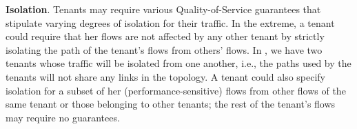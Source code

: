 \begin{compactitemize}
\item \textbf{Isolation}. Tenants may require various Quality-of-Service guarantees
  that stipulate varying degrees of isolation for their traffic. In the
  extreme, a tenant could require that her flows are not affected by
  any other tenant by strictly isolating the path of the tenant's
  flows from others' flows. In , we have two
  tenants whose traffic will be isolated from one another, i.e., the
  paths used by the tenants will not share any links in the topology.
  A tenant could also specify isolation for a subset of her
  (performance-sensitive) flows from other flows of the same tenant or
  those belonging to other tenants; the rest of the tenant's flows may
  require no guarantees.

 


\end{compactitemize}

